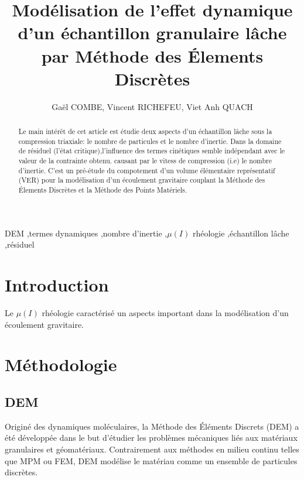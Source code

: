 \documentclass[5p,authoryear,square]{elsarticle}
\begin{document}
\begin{frontmatter}

\title{\textbf{Modélisation de l'effet dynamique d'un échantillon granulaire lâche par Méthode des Élements Discrètes}}

\author{Gaël COMBE, Vincent RICHEFEU, Viet Anh QUACH}
\address{Laboratoire 3SR, Université Grenoble Alpes}


\begin{abstract}
Le main intérêt de cet article est étudie deux aspects d'un échantillon lâche sous la compression triaxiale: le nombre de particules et le nombre d'inertie. 
Dans la domaine de résiduel (l'état critique),l'influence des termes cinétiques semble indépendant avec le valeur de la contrainte obtenu. causant par le vitess de compression (i.e) le nombre d'inertie.
C'est un pré-étude du compotement d'un volume élémentaire représentatif (VER) pour la modélisation d'un écoulement gravitaire couplant la Méthode des Élements Discrètes et la Méthode des Points Matériels.

\end{abstract}

\begin{keyword}
DEM \sep termes dynamiques \sep nombre d'inertie \sep $\mu(I)$ rhéologie \sep échantillon lâche \sep résiduel
\end{keyword}

\end{frontmatter}

\section{Introduction}\label{introduction}
Le $\mu(I)$ rhéologie caractérisé un aspects important dans la modélisation d'un écoulement gravitaire.  

\section{Méthodologie}\label{methode}

\subsection{DEM}\label{dem}
Originé des dynamiques moléculaires, la Méthode des Éléments Discrets (DEM) a été développée dans le but d'étudier les problèmes mécaniques liés aux matériaux granulaires et géomatériaux. Contrairement aux méthodes en milieu continu telles que MPM ou FEM, DEM modélise le matériau comme un ensemble de particules discrètes.
\end{document}
